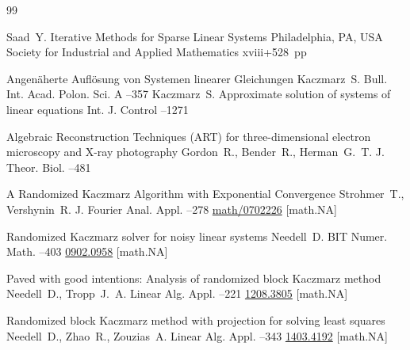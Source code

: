 \begin{thebibliography}{99}

\by Saad~Y.
\book Iterative Methods for Sparse Linear Systems
\publaddr Philadelphia, PA, USA
\publ Society for Industrial and Applied Mathematics
\totalpages xviii+528~pp \nofrills 
{}

\paper Angen\"{a}herte Aufl\"{o}sung von Systemen linearer Gleichungen
\by Kaczmarz~S.
\jour Bull. Int. Acad. Polon. Sci. A
--357
\moreref
\by Kaczmarz~S.
\paper Approximate solution of systems of linear equations
\jour Int. J. Control 
--1271 

\paper Algebraic Reconstruction Techniques (ART) for three-dimensional electron microscopy and X-ray photography
\by Gordon~R., Bender~R., Herman~G.~T.
\jour J. Theor. Biol.
--481

\paper A Randomized Kaczmarz Algorithm with Exponential  Convergence
\by Strohmer~T., Vershynin~R.
\jour J. Fourier Anal. Appl.
--278
\arxiv \href{https://arxiv.org/abs/math/0702226}{math/0702226} [math.NA]

\paper Randomized Kaczmarz solver for noisy linear systems
\by Needell~D.
\jour BIT Numer. Math.
--403
\arxiv \href{https://arxiv.org/abs/0902.0958}{0902.0958} [math.NA]

\paper Paved with good intentions: Analysis of randomized block Kaczmarz method
\by Needell~D., Tropp~J.~A.
\jour  	Linear Alg. Appl.
--221
\arxiv \href{https://arxiv.org/abs/1208.3805}{1208.3805} [math.NA]

\paper Randomized block Kaczmarz method with projection for solving least squares
\by Needell~D., Zhao~R., Zouzias~A.
\jour  	Linear Alg. Appl.
--343
\arxiv \href{https://arxiv.org/abs/1403.4192}{1403.4192} [math.NA]


\end{thebibliography}
